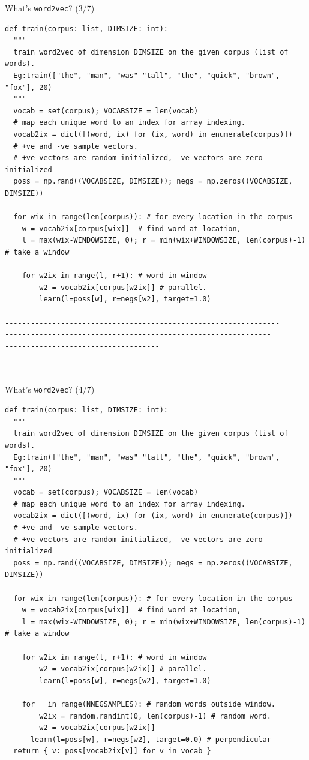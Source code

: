 \documentclass[8pt]{beamer}
\begin{document}
\begin{frame}[fragile]{What's \texttt{word2vec}? (3/7)}
\begin{verbatim}
def train(corpus: list, DIMSIZE: int):
  """
  train word2vec of dimension DIMSIZE on the given corpus (list of words).
  Eg:train(["the", "man", "was" "tall", "the", "quick", "brown", "fox"], 20)
  """
  vocab = set(corpus); VOCABSIZE = len(vocab)
  # map each unique word to an index for array indexing.
  vocab2ix = dict([(word, ix) for (ix, word) in enumerate(corpus)])
  # +ve and -ve sample vectors.
  # +ve vectors are random initialized, -ve vectors are zero initialized
  poss = np.rand((VOCABSIZE, DIMSIZE)); negs = np.zeros((VOCABSIZE, DIMSIZE))

  for wix in range(len(corpus)): # for every location in the corpus
    w = vocab2ix[corpus[wix]]  # find word at location,
    l = max(wix-WINDOWSIZE, 0); r = min(wix+WINDOWSIZE, len(corpus)-1) # take a window

    for w2ix in range(l, r+1): # word in window
        w2 = vocab2ix[corpus[w2ix]] # parallel.
        learn(l=poss[w], r=negs[w2], target=1.0)

----------------------------------------------------------------
--------------------------------------------------------------
------------------------------------
--------------------------------------------------------------
-------------------------------------------------
\end{verbatim}
\end{frame}


\begin{frame}[fragile]{What's \texttt{word2vec}? (4/7)}
\begin{verbatim}
def train(corpus: list, DIMSIZE: int):
  """
  train word2vec of dimension DIMSIZE on the given corpus (list of words).
  Eg:train(["the", "man", "was" "tall", "the", "quick", "brown", "fox"], 20)
  """
  vocab = set(corpus); VOCABSIZE = len(vocab)
  # map each unique word to an index for array indexing.
  vocab2ix = dict([(word, ix) for (ix, word) in enumerate(corpus)])
  # +ve and -ve sample vectors.
  # +ve vectors are random initialized, -ve vectors are zero initialized
  poss = np.rand((VOCABSIZE, DIMSIZE)); negs = np.zeros((VOCABSIZE, DIMSIZE))

  for wix in range(len(corpus)): # for every location in the corpus
    w = vocab2ix[corpus[wix]]  # find word at location,
    l = max(wix-WINDOWSIZE, 0); r = min(wix+WINDOWSIZE, len(corpus)-1) # take a window

    for w2ix in range(l, r+1): # word in window
        w2 = vocab2ix[corpus[w2ix]] # parallel.
        learn(l=poss[w], r=negs[w2], target=1.0)

    for _ in range(NNEGSAMPLES): # random words outside window. 
        w2ix = random.randint(0, len(corpus)-1) # random word.
        w2 = vocab2ix[corpus[w2ix]] 
      learn(l=poss[w], r=negs[w2], target=0.0) # perpendicular
  return { v: poss[vocab2ix[v]] for v in vocab } 
\end{verbatim}
\end{frame}
\end{document}
